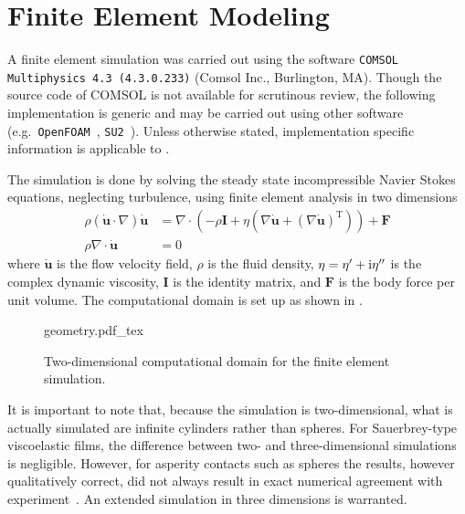 \section{Finite Element Modeling}\label{sec:finiteelementdingus}
A finite element simulation was carried out using the software
\texttt{COMSOL Multiphysics 4.3 (4.3.0.233)} (Comsol Inc., Burlington, MA).
Though the source code of COMSOL is not available for scrutinous review,
the following implementation is generic and may be carried out using other
software (e.g.\ \texttt{OpenFOAM}~\cite{jasak2007openfoam},
\texttt{SU2}~\cite{palacios2013stanford}).  Unless otherwise stated,
implementation specific information is applicable to \comsol.

The simulation is done by solving the steady state incompressible Navier
Stokes equations, neglecting turbulence, using finite element analysis in
two dimensions
\begin{align}
 \rho\left(\mathbf{\dot{u}}\cdot \nabla\right)\mathbf{\dot{u}}
				&=\nabla \cdot {\left( -\rho \mathbf{I} + \eta \left(\nabla \mathbf{\dot{u}} +
				{\left( \nabla \mathbf{\dot{u}}\right)}^\mathrm{T}\right)\right)} + \mathbf{F}\\
 \rho \nabla \cdot \mathbf{\dot{u}} &= 0
\end{align}
where $\mathbf{\dot{u}}$ is the flow velocity field, $\rho$ is the fluid
density, $\eta = \eta^\prime + {\mathrm{i}}\eta^{\prime\prime}$ is the complex
dynamic viscosity, $\mathbf{I}$ is the identity matrix, and $\mathbf{F}$ is
the body force per unit volume.  The computational domain is set up as
shown in .
\begin{figure}[h]
 \centering
 {geometry.pdf_tex}
 \caption{Two-dimensional computational domain for the finite element simulation.}
\label{fig:compgeometry}
\end{figure}

It is important to note that, because the simulation is two-dimensional, what
is actually simulated are infinite cylinders rather than spheres.  For
Sauerbrey-type viscoelastic films, the difference between two- and
three-dimensional simulations is negligible.  However, for asperity contacts
such as spheres the results, however qualitatively correct, did not always
result in exact numerical agreement with experiment~\cite{Vittorias2010489}.
An extended simulation in three dimensions is warranted.

